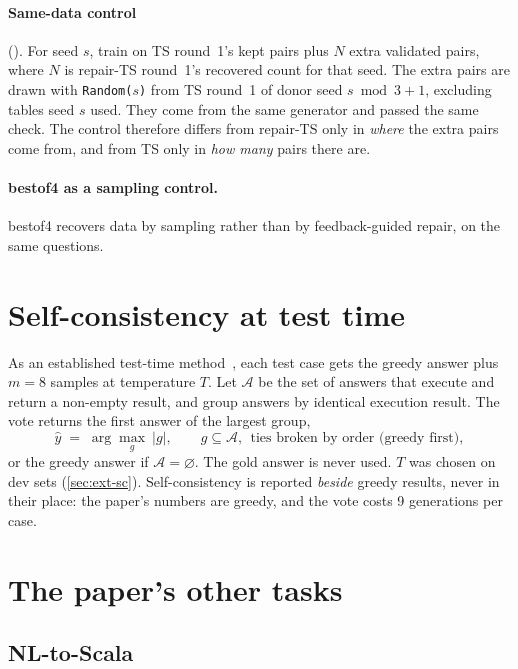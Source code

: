 \paragraph{Same-data control} (). For seed $s$, train on TS round~1's kept pairs plus $N$
extra validated pairs, where $N$ is repair-TS round~1's recovered count for that seed. The extra pairs are drawn with
\texttt{Random(}$s$\texttt{)} from TS round~1 of donor seed $s \bmod 3 + 1$, excluding tables seed $s$ used. They come
from the same generator and passed the same check. The control therefore differs from repair-TS only in \emph{where}
the extra pairs come from, and from TS only in \emph{how many} pairs there are.

\paragraph{bestof4 as a sampling control.} bestof4 recovers data by sampling rather than by feedback-guided repair, on
the same questions.

\section{Self-consistency at test time}\label{sec:method-sc}

As an established test-time method~\cite{wang2022selfconsistency,wang2018egd}, each test case gets the greedy answer
plus $m=8$ samples at temperature $T$. Let $\mathcal{A}$ be the set of answers that execute and return a non-empty
result, and group answers by identical execution result. The vote returns the first answer of the largest group,
\begin{equation}
  \hat y \;=\; \arg\max_{g}\ |g|,\qquad g \subseteq \mathcal{A},\ \ \text{ties broken by order (greedy first)},
\end{equation}
or the greedy answer if $\mathcal{A}=\varnothing$. The gold answer is never used. $T$ was chosen on dev sets
(\cref{sec:ext-sc}). Self-consistency is reported \emph{beside} greedy results, never in their place: the paper's
numbers are greedy, and the vote costs 9 generations per case.

\section{The paper's other tasks}\label{sec:method-other}

\subsection{NL-to-Scala}

